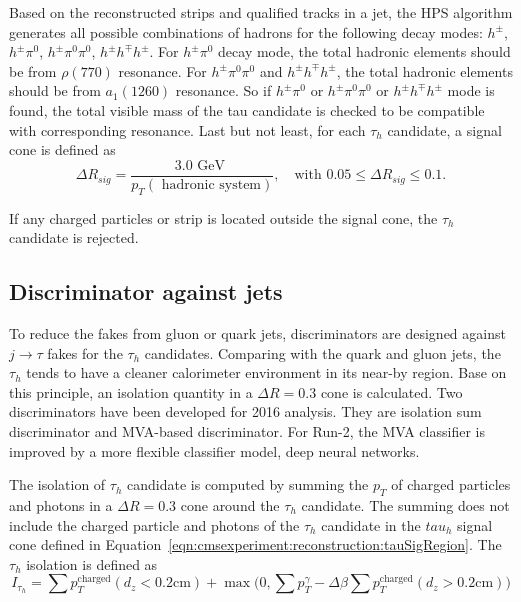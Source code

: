 Based on the reconstructed strips and qualified tracks in a jet, the HPS algorithm generates all possible combinations of hadrons for the following decay modes: $h^\pm$, $h^\pm \pi^0$, $h^\pm \pi^0 \pi^0$, $h^\pm h^\mp h^\pm$. For $h^\pm \pi^0$ decay mode, the total hadronic elements should be from $\rho(770)$ resonance. For $h^\pm \pi^0 \pi^0$ and $h^\pm h^\mp h^\pm$, the total hadronic elements should be from $a_1(1260)$ resonance. So if $h^\pm \pi^0$ or $h^\pm \pi^0 \pi^0$ or $h^\pm h^\mp h^\pm$ mode is found, the total visible mass of the tau candidate is checked to be compatible with corresponding resonance. Last but not least, for each $\tau_h$ candidate, a signal cone is defined as
\begin{equation}
	\Delta R_{sig} = \frac{3.0 \text{ GeV } } { p_T (\text{ hadronic system})  }, \quad \text{with } 0.05 \leq \Delta R_{sig} \leq 0.1.
	\label{eqn:cmsexperiment:reconstruction:tauSigRegion}
\end{equation}

\noindent If any charged particles or strip is located outside the signal cone, the $\tau_h$ candidate is rejected.

\subsection{Discriminator against jets}

To reduce the fakes from gluon or quark jets, discriminators are designed against $j\to \tau$ fakes for the $\tau_h$ candidates. Comparing with the quark and gluon jets, the $\tau_h$ tends to have a cleaner calorimeter environment in its near-by region. Base on this principle, an isolation quantity in a $\Delta R = 0.3$ cone is calculated. Two discriminators have been developed for 2016 analysis. They are isolation sum discriminator and MVA-based discriminator. For Run-2, the MVA classifier is improved by a more flexible classifier model, deep neural networks. 

The isolation of $\tau_h$ candidate is computed by summing the $p_T$ of charged particles and photons in a $\Delta R = 0.3$ cone around the $\tau_h$ candidate. The summing does not include the charged particle and photons of the $\tau_h$ candidate in the $tau_h$ signal cone defined in Equation~\ref{eqn:cmsexperiment:reconstruction:tauSigRegion}. The $\tau_h$ isolation is defined as
\begin{equation}
	I_{\tau_h} = \sum p_T^{\text{charged}} (d_z<0.2 \text{cm}) + \max \bigg( 0, \sum p_T^ \gamma - \Delta \beta \sum p_T^{\text{charged}} (d_z>0.2 \text{cm})  \bigg )
    \label{eqn:cmsexperiment:reconstruction:tauIso}
\end{equation}

